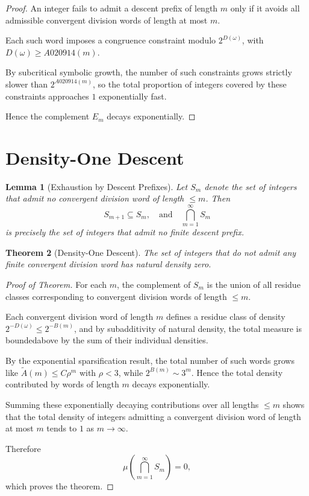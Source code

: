 \documentclass[12pt, oneside]{article}
\numberwithin{equation}{section}
\theoremstyle{definition}
\theoremstyle{plain}
\newtheorem{theorem}{Theorem}[section]
\newtheorem{lemma}[theorem]{Lemma}
\theoremstyle{remark}
\begin{document}
\begin{proof}
An integer fails to admit a descent prefix of length $m$ only if it avoids
all admissible convergent division words of length at most $m$.

Each such word imposes a congruence constraint modulo $2^{D(\omega)}$,
with $D(\omega) \ge A020914(m)$.

By subcritical symbolic growth, the number of such constraints grows
strictly slower than $2^{A020914(m)}$, so the total proportion of integers
covered by these constraints approaches $1$ exponentially fast.

Hence the complement $E_m$ decays exponentially.
\end{proof}

\section{Density-One Descent}
\label{sec:density-one-descent}

\begin{lemma}[Exhaustion by Descent Prefixes]
Let $S_m$ denote the set of integers that admit no convergent division word
of length $\le m$. Then
\[
S_{m+1} \subseteq S_m,
\quad\text{and}\quad
\bigcap_{m=1}^\infty S_m
\]
is precisely the set of integers that admit no finite descent prefix.
\end{lemma}

\begin{theorem}[Density-One Descent]
The set of integers that do not admit any finite convergent division word
has natural density zero.
\end{theorem}

\begin{proof}[Proof of Theorem]
For each $m$, the complement of $S_m$ is the union of all residue classes
corresponding to convergent division words of length $\le m$.

Each convergent division word of length $m$ defines a residue class of
density $2^{-D(\omega)} \le 2^{-B(m)}$, and by subadditivity of natural density,
the total measure is boundedabove by the sum of their individual densities.

By the exponential sparsification result, the total number of such words
grows like $\widetilde A(m) \le C \rho^m$ with $\rho < 3$, while
$2^{B(m)} \sim 3^m$. Hence the total density contributed by words of length
$m$ decays exponentially.

Summing these exponentially decaying contributions over all lengths $\le m$
shows that the total density of integers admitting a convergent division word
of length at most $m$ tends to $1$ as $m \to \infty$.

Therefore
\[
\mu\!\left(\bigcap_{m=1}^\infty S_m\right) = 0,
\]
which proves the theorem.
\end{proof}
\end{document}
